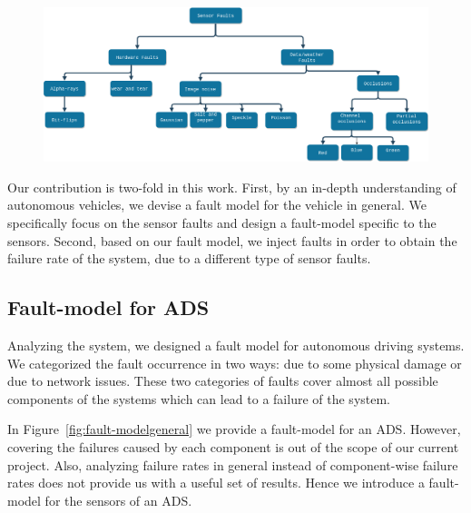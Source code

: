 
 \begin{figure}
 	\centering
 	\includegraphics[width=0.7\linewidth]{finalFM}
 	\caption[Fault model for camera]{}
 	\label{fig:finalfm}
 \end{figure}
 


Our contribution is two-fold in this work. First, by an in-depth understanding of autonomous vehicles, we devise a fault model for the vehicle in general. We specifically focus on the sensor faults and design a fault-model specific to the sensors. Second, based on our fault model, we inject faults in order to obtain the failure rate of the system, due to a different type of sensor faults.

\subsection{Fault-model for ADS}
Analyzing the system, we designed a fault model for autonomous driving systems. We categorized the fault occurrence in two ways: due to some physical damage or due to network issues. These two categories of faults cover almost all possible components of the systems which can lead to a failure of the system. 

In Figure~\ref{fig:fault-modelgeneral} we provide a fault-model for an ADS. However, covering the failures caused by each component is out of the scope of our current project. Also, analyzing failure rates in general instead of component-wise failure rates does not provide us with a useful set of results. Hence we introduce a fault-model for the sensors of an ADS. 

